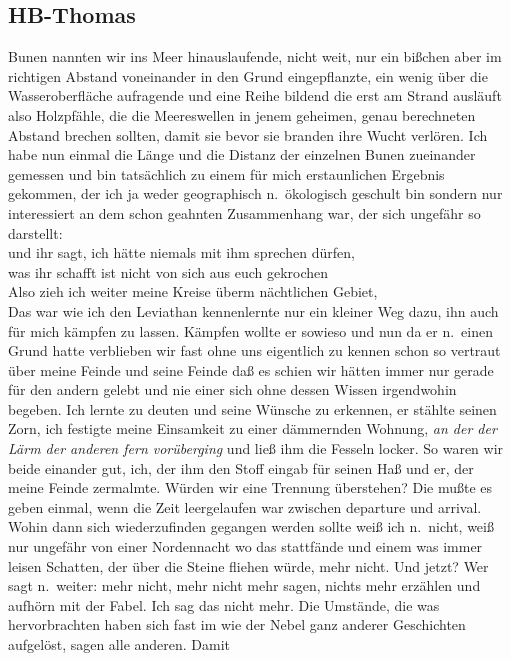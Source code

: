 \documentclass[
]{article}
\author{}
\date{\vspace{-2.5em}}
\begin{document}
\subsection{HB-Thomas}\label{hb-thomas}

Bunen nannten wir ins Meer hinauslaufende, nicht weit, nur ein bißchen
aber im richtigen Abstand voneinander in den Grund eingepflanzte, ein
wenig über die Wasseroberfläche aufragende und eine Reihe bildend die
erst am Strand ausläuft also Holzpfähle, die die Meereswellen in jenem
geheimen, genau berechneten Abstand brechen sollten, damit sie bevor sie
branden ihre Wucht verlören. Ich habe nun einmal die Länge und die
Distanz der einzelnen Bunen zueinander gemessen und bin tatsächlich zu
einem für mich erstaunlichen Ergebnis gekommen, der ich ja weder
geographisch n.~ökologisch geschult bin sondern nur interessiert an dem
schon geahnten Zusammenhang war, der sich ungefähr so darstellt:\\
und ihr sagt, ich hätte niemals mit ihm sprechen dürfen,\\
was ihr schafft ist nicht von sich aus euch gekrochen\\
Also zieh ich weiter meine Kreise überm nächtlichen Gebiet,\\
Das war wie ich den Leviathan kennenlernte nur ein kleiner Weg dazu, ihn
auch für mich kämpfen zu lassen. Kämpfen wollte er sowieso und nun da er
n.~einen Grund hatte verblieben wir fast ohne uns eigentlich zu kennen
schon so vertraut über meine Feinde und seine Feinde daß es schien wir
hätten immer nur gerade für den andern gelebt und nie einer sich ohne
dessen Wissen irgendwohin begeben. Ich lernte zu deuten und seine
Wünsche zu erkennen, er stählte seinen Zorn, ich festigte meine
Einsamkeit zu einer dämmernden Wohnung, \emph{an der der Lärm der
anderen fern vorüberging} und ließ ihm die Fesseln locker. So waren wir
beide einander gut, ich, der ihm den Stoff eingab für seinen Haß und er,
der meine Feinde zermalmte. Würden wir eine Trennung überstehen? Die
mußte es geben einmal, wenn die Zeit leergelaufen war zwischen departure
und arrival. Wohin dann sich wiederzufinden gegangen werden sollte weiß
ich n.~nicht, weiß nur ungefähr von einer Nordennacht wo das stattfände
und einem was immer leisen Schatten, der über die Steine fliehen würde,
mehr nicht. Und jetzt? Wer sagt n.~weiter: mehr nicht, mehr nicht mehr
sagen, nichts mehr erzählen und aufhörn mit der Fabel. Ich sag das nicht
mehr. Die Umstände, die was hervorbrachten haben sich fast im wie der
Nebel ganz anderer Geschichten aufgelöst, sagen alle anderen. Damit
\end{document}
